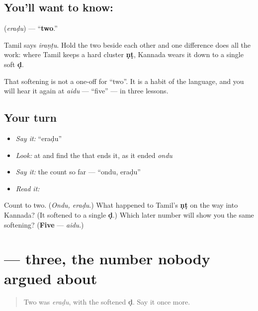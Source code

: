 \subsection*{You'll want to know: }
\textbf{} (\emph{eraḍu}) — \textquotedblleft{}\textbf{two}.\textquotedblright{}

Tamil says \emph{iraṇṭu}. Hold the two beside each other and one difference does all the work: where Tamil keeps a hard cluster \textbf{ṇṭ}, Kannada wears it down to a single soft \textbf{ḍ}.

That softening is not a one-off for \textquotedblleft{}two\textquotedblright{}. It is a habit of the language, and you will hear it again at \emph{aidu} — \textquotedblleft{}five\textquotedblright{} — in three lessons.

\subsection*{Your turn}
\begin{itemize}
\raggedright
  \item \emph{Say it:} \textquotedblleft{}eraḍu\textquotedblright{}
  \item \emph{Look:} at  and find the  that ends it, as it ended \emph{ondu}
  \item \emph{Say it:} the count so far — \textquotedblleft{}ondu, eraḍu\textquotedblright{}
  \item \emph{Read it:} \textbf{}
\end{itemize}

\begin{tcolorbox}[breakable,colback=teal!4,colframe=teal!35!black,title={Before you move on}]
Count to two. (\emph{Ondu, eraḍu}.) What happened to Tamil's \textbf{ṇṭ} on the way into Kannada? (It softened to a single \textbf{ḍ}.) Which later number will show you the same softening? (\textbf{Five} — \emph{aidu}.)
\end{tcolorbox}
\section[\texorpdfstring{\kn{ಮೂರು} (mūru)}{ಮೂರು (mūru)}]{ — three, the number nobody argued about}

\label{lesson:KA-C07-muuru}



\begin{quote}
Two was \emph{eraḍu}, with the softened \textbf{ḍ}. Say it once more.
\end{quote}

